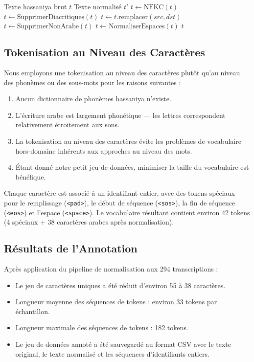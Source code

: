 \documentclass[12pt,a4paper]{article}
\begin{document}
\begin{algorithm}[H]
\caption{Normalisation du Texte Hassaniya}
\label{alg:normalize}
\begin{algorithmic}[1]
\Require Texte hassaniya brut $t$
\Ensure Texte normalisé $t'$
\State $t \gets \text{NFKC}(t)$
\State $t \gets \text{SupprimerDiacritiques}(t)$
    \State $t \gets t.\text{remplacer}(src, dst)$
\EndFor
\State $t \gets \text{SupprimerNonArabe}(t)$
\State $t \gets \text{NormaliserEspaces}(t)$
\State \Return $t$
\end{algorithmic}
\end{algorithm}

\subsection{Tokenisation au Niveau des Caractères}

Nous employons une tokenisation au niveau des caractères plutôt qu'au niveau des phonèmes ou des sous-mots pour les raisons suivantes :

\begin{enumerate}
    \item Aucun dictionnaire de phonèmes hassaniya n'existe.
    \item L'écriture arabe est largement phonétique --- les lettres correspondent relativement étroitement aux sons.
    \item La tokenisation au niveau des caractères évite les problèmes de vocabulaire hors-domaine inhérents aux approches au niveau des mots.
    \item Étant donné notre petit jeu de données, minimiser la taille du vocabulaire est bénéfique.
\end{enumerate}

Chaque caractère est associé à un identifiant entier, avec des tokens spéciaux pour le remplissage (\texttt{<pad>}), le début de séquence (\texttt{<sos>}), la fin de séquence (\texttt{<eos>}) et l'espace (\texttt{<space>}). Le vocabulaire résultant contient environ 42 tokens (4 spéciaux + 38 caractères arabes après normalisation).

\subsection{Résultats de l'Annotation}

Après application du pipeline de normalisation aux 294 transcriptions :

\begin{itemize}
    \item Le jeu de caractères uniques a été réduit d'environ 55 à 38 caractères.
    \item Longueur moyenne des séquences de tokens : environ 33 tokens par échantillon.
    \item Longueur maximale des séquences de tokens : 182 tokens.
    \item Le jeu de données annoté a été sauvegardé au format CSV avec le texte original, le texte normalisé et les séquences d'identifiants entiers.
\end{itemize}
\end{document}
